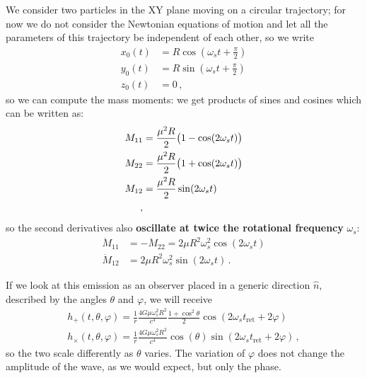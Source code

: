 \documentclass[main.tex]{subfiles}
\begin{document}
We consider two particles in the XY plane moving on a circular trajectory; for now we do not consider the Newtonian equations of motion and let all the parameters of this trajectory be independent of each other, so we write 
%
\begin{subequations}
\begin{align}
x_0 (t) &= R \cos(\omega_{s} t + \frac{\pi}{2}) \\
y_0 (t) &= R \sin(\omega_{s} t + \frac{\pi}{2}) \\
z_0 (t) &= 0
\,,
\end{align}
\end{subequations}
%
so we can compute the mass moments: we get products of sines and cosines which can be written as:
%
\begin{align}
M_{11} &= \frac{\mu^2R}{2} \qty(1 - \cos(2 \omega_{s}t)) \\
M_{22} &= \frac{\mu^2R}{2} \qty(1 + \cos(2 \omega_{s}t)) \\
M_{12} &= \frac{\mu^2R}{2} \sin(2 \omega_{s}t) \\
\,,
\end{align}
%
so the second derivatives also \textbf{oscillate at twice the rotational frequency} \(\omega_{s}\):
%
\begin{subequations}
\begin{align}
\ddot{M}_{11} &= - \ddot{M}_{22} = 2 \mu R^2 \omega_{s}^2 \cos(2 \omega_{s}t)  \\
\ddot{M}_{12} &= 2 \mu R^2\omega_{s}^2  \sin( 2 \omega_{s}t)
\,.
\end{align}
\end{subequations}

If we look at this emission as an observer placed in a generic direction \(\hat{n}\), described by the angles \(\theta \) and \(\varphi \), we will receive 
%
\begin{subequations}
\begin{align}
h_{+} (t, \theta , \varphi ) = \frac{1}{r} \frac{4G \mu \omega_{s}^2 R^2}{c^{4}} \frac{1 + \cos^2\theta }{2} \cos(2 \omega_{s}t _{\text{ret}} + 2 \varphi  ) \\
h_{ \times } (t, \theta , \varphi ) = \frac{1}{r} \frac{4G \mu \omega_{s}^2 R^2}{c^{4}} \cos(\theta ) \sin(2 \omega_{s}t _{\text{ret}} + 2 \varphi  )
\,,
\end{align}
\end{subequations}
%
so the two scale differently as \(\theta \) varies.
The variation of \(\varphi \) does not change the amplitude of the wave, as we would expect, but only the phase.
\end{document}
